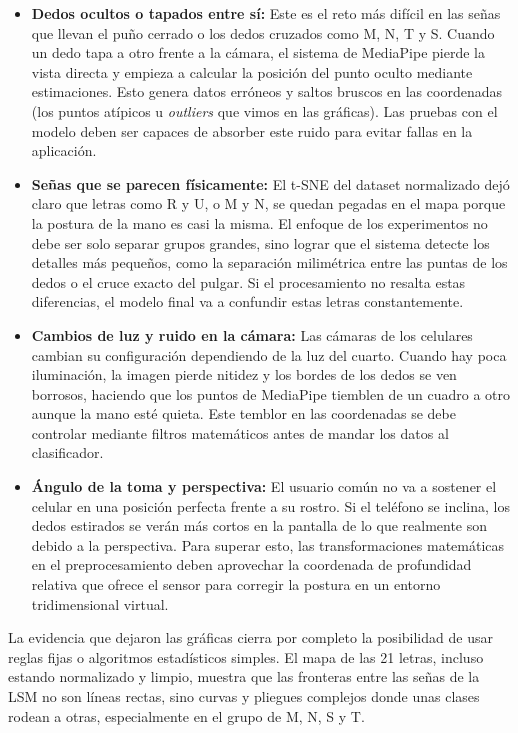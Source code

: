 	\begin{itemize}
		\item \textbf{Dedos ocultos o tapados entre sí:} Este es el reto más difícil en las señas que llevan el puño cerrado o los dedos cruzados como M, N, T y S. Cuando un dedo tapa a otro frente a la cámara, el sistema de MediaPipe pierde la vista directa y empieza a calcular la posición del punto oculto mediante estimaciones. Esto genera datos erróneos y saltos bruscos en las coordenadas (los puntos atípicos u \textit{outliers} que vimos en las gráficas). Las pruebas con el modelo deben ser capaces de absorber este ruido para evitar fallas en la aplicación.
		\item \textbf{Señas que se parecen físicamente:} El t-SNE del dataset normalizado dejó claro que letras como R y U, o M y N, se quedan pegadas en el mapa porque la postura de la mano es casi la misma. El enfoque de los experimentos no debe ser solo separar grupos grandes, sino lograr que el sistema detecte los detalles más pequeños, como la separación milimétrica entre las puntas de los dedos o el cruce exacto del pulgar. Si el procesamiento no resalta estas diferencias, el modelo final va a confundir estas letras constantemente.
		\item \textbf{Cambios de luz y ruido en la cámara:} Las cámaras de los celulares cambian su configuración dependiendo de la luz del cuarto. Cuando hay poca iluminación, la imagen pierde nitidez y los bordes de los dedos se ven borrosos, haciendo que los puntos de MediaPipe tiemblen de un cuadro a otro aunque la mano esté quieta. Este temblor en las coordenadas se debe controlar mediante filtros matemáticos antes de mandar los datos al clasificador.
		\item \textbf{Ángulo de la toma y perspectiva:} El usuario común no va a sostener el celular en una posición perfecta frente a su rostro. Si el teléfono se inclina, los dedos estirados se verán más cortos en la pantalla de lo que realmente son debido a la perspectiva. Para superar esto, las transformaciones matemáticas en el preprocesamiento deben aprovechar la coordenada de profundidad relativa que ofrece el sensor para corregir la postura en un entorno tridimensional virtual.
	\end{itemize}
	
	
	La evidencia que dejaron las gráficas cierra por completo la posibilidad de usar reglas fijas o algoritmos estadísticos simples. El mapa de las 21 letras, incluso estando normalizado y limpio, muestra que las fronteras entre las señas de la LSM no son líneas rectas, sino curvas y pliegues complejos donde unas clases rodean a otras, especialmente en el grupo de M, N, S y T.
	
